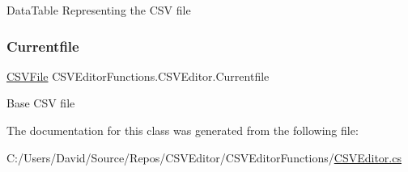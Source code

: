 Data\+Table Representing the C\+SV file 

\mbox{\label{class_c_s_v_editor_functions_1_1_c_s_v_editor_ad426611ea71bd6214812f5ddf23646b4}} 
\subsubsection{\texorpdfstring{Currentfile}{Currentfile}}
{\footnotesize\ttfamily \mbox{\hyperlink{class_c_s_v_editor_functions_1_1_c_s_v_file}{C\+S\+V\+File}} C\+S\+V\+Editor\+Functions.\+C\+S\+V\+Editor.\+Currentfile}



Base C\+SV file 



The documentation for this class was generated from the following file\+:\begin{DoxyCompactItemize}
\item 
C\+:/\+Users/\+David/\+Source/\+Repos/\+C\+S\+V\+Editor/\+C\+S\+V\+Editor\+Functions/\mbox{\hyperlink{_c_s_v_editor_8cs}{C\+S\+V\+Editor.\+cs}}\end{DoxyCompactItemize}
